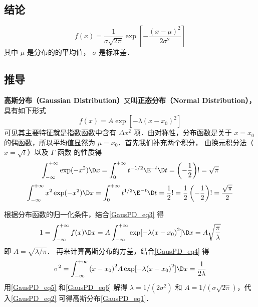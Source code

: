 
\subsection{结论}
\begin{equation}\label{GausPD_eq1}
f(x) = \frac{1}{{\sigma \sqrt {2\pi } }}\exp \left[ { - \frac{{{{(x - \mu )}^2}}}{{2{\sigma ^2}}}} \right]
\end{equation}
其中 $\mu$ 是分布的的平均值， $\sigma$ 是标准差．

\subsection{推导}
\textbf{高斯分布（Gaussian Distribution）}又叫\textbf{正态分布（Normal Distribution），}具有如下形式
\begin{equation}\label{GausPD_eq2}
f\left( x \right) = A\exp [ - \lambda {(x - {x_0})^2}]
\end{equation}
可见其主要特征就是指数函数中含有 $\Delta x^2$ 项．由对称性，分布函数是关于 $x =x_0$ 的偶函数，所以平均值显然为 $\mu = x_0$．首先我们补充两个积分， 由换元积分法（$x=\sqrt{t}$）以及 $\Gamma$ 函数 的性质得
\begin{equation}\label{GausPD_eq3}
\int_{ - \infty }^{ + \infty } {\exp ( - {x^2})\D x}  = \int_0^{ + \infty } {{t^{ -1/2}}{\E^{ - t}}\D t}  = \left( -\frac 12\right)! = \sqrt \pi 
\end{equation}
\begin{equation}\label{GausPD_eq4}
\int_{ - \infty }^{ + \infty } {{x^2}\exp ( - {x^2})\D x}  = \int_0^{ + \infty } {{t^{1/2}}{\E^{ - t}}\D t}  = \frac{1}{2}! = \frac{1}{2}\left( { - \frac{1}{2}} \right)! = \frac{{\sqrt \pi  }}{2}
\end{equation}

根据分布函数的归一化条件，结合\autoref{GausPD_eq3} 得
\begin{equation}\label{GausPD_eq5}
1 = \int_{ - \infty }^{ + \infty } {f(x)\D x}  = A\int_{ - \infty }^{ + \infty } {\exp [ - \lambda {{(x - {x_0})}^2}]\D x}  = A\sqrt {\frac{\pi }{\lambda }}
\end{equation}
即 $A = \sqrt {\lambda /\pi }$． 再来计算高斯分布的方差，结合\autoref{GausPD_eq4} 得
\begin{equation}\label{GausPD_eq6}
{\sigma ^2} = \int_{ - \infty }^{ + \infty } {{{(x - {x_0})}^2}A\exp [ - \lambda {{(x - {x_0})}^2}]\D x}  = \frac{1}{{2\lambda }}
\end{equation}
用\autoref{GausPD_eq5} 和\autoref{GausPD_eq6} 解得 $\lambda = 1/(2\sigma^2)$ 和 $A = 1/(\sigma\sqrt{2\pi})$，代入\autoref{GausPD_eq2} 可得高斯分布\autoref{GausPD_eq1}．